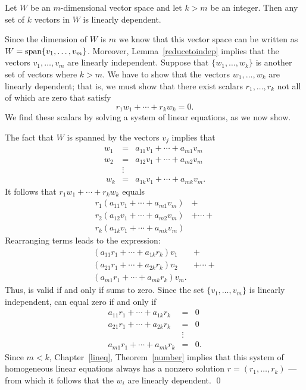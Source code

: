\documentclass{ximera}
\begin{document}
\begin{lemma}  \label{lem:lindep}
Let $W$ be an $m$-dimensional vector space and let $k>m$ be an integer.
Then any set of $k$ vectors in $W$ is linearly dependent.
\end{lemma} 

\proof Since the dimension of $W$ is $m$ we know that
this vector space can be written as $W={\rm span}\{v_1,\ldots,v_m\}$.
Moreover, Lemma~\ref{reducetoindep} implies that the vectors
$v_1,\ldots,v_m$ are linearly independent.  Suppose that
$\{w_1,\ldots,w_k\}$ is another set of vectors where $k>m$.
We have to show that the vectors $w_1,\ldots,w_k$ are linearly
dependent; that is, we must show that there exist scalars
$r_1,\ldots,r_k$ not all of which are zero that satisfy
\begin{equation} \label{independence1}
r_1w_1 + \cdots + r_kw_k = 0.
\end{equation}
We find these scalars by solving a system of linear equations, as
we now show.

The fact that $W$ is spanned by the vectors $v_j$ implies that
\begin{eqnarray*}
w_1 & = & a_{11}v_1 + \cdots + a_{m1}v_m\ \\
w_2 & = & a_{12}v_1 + \cdots + a_{m2}v_m\ \\
 & \vdots & \\\
w_k & = & a_{1k}v_1 + \cdots + a_{mk}v_m.
\end{eqnarray*}
It follows that $r_1w_1 + \cdots + r_kw_k$ equals
\[
\begin{array}{ll}
r_1(a_{11}v_1 + \cdots + a_{m1}v_m) & +  \\
r_2(a_{12}v_1 + \cdots + a_{m2}v_m) & + \cdots + \\
r_k(a_{1k}v_1 + \cdots + a_{mk}v_m) &
\end{array}
\]
Rearranging terms leads to the expression:
\begin{equation}   \label{e:r1v1etc}
\begin{array}{ll}
(a_{11}r_1 + \cdots + a_{1k}r_k)v_1\ & + \\
(a_{21}r_1 + \cdots + a_{2k}r_k)v_2\ & + \cdots + \\
(a_{m1}r_1 + \cdots + a_{mk}r_k)v_m. &
\end{array}
\end{equation}
Thus,  is valid if and only if 
sums to zero.  Since the set $\{v_1,\ldots,v_m\}$ is linearly
independent, \Ref{e:r1v1etc} can equal zero if and only if
\begin{eqnarray*}
a_{11}r_1 + \cdots + a_{1k}r_k & = & 0\ \\
a_{21}r_1 + \cdots + a_{2k}r_k & = & 0\ \\
          & \vdots &   \\
a_{m1}r_1 + \cdots + a_{mk}r_k & = & 0.
\end{eqnarray*}
Since $m<k$, Chapter~\ref{lineq}, Theorem~\ref{number} implies that
this system of homogeneous linear equations always has a nonzero
solution $r=(r_1,\ldots,r_k)$ --- from which it follows that the
$w_i$ are linearly dependent.  \qed
\end{document}
